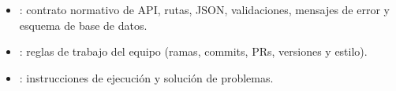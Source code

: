 \begin{itemize}
  \item {}: contrato normativo de API, rutas, JSON, validaciones, mensajes de error y esquema de base de datos.
  \item {}: reglas de trabajo del equipo (ramas, commits, PRs, versiones y estilo).
  \item {}: instrucciones de ejecución y solución de problemas.
\end{itemize}


